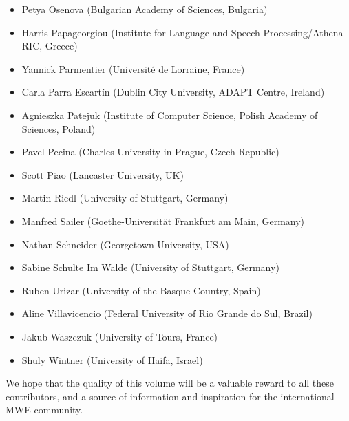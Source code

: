 \documentclass[output=paper,
modfonts,
]{langscibook}
\begin{document}
\begin{itemize}
\item Petya Osenova (Bulgarian Academy of Sciences, Bulgaria)
\item Harris Papageorgiou (Institute for Language and Speech Processing/Athena RIC, Greece)
\item Yannick Parmentier (Université de Lorraine, France)
\item Carla Parra Escartín (Dublin City University, ADAPT Centre, Ireland)
\item Agnieszka Patejuk (Institute of Computer Science, Polish Academy of Sciences, Poland)
\item Pavel Pecina (Charles University in Prague, Czech Republic)
\item Scott Piao (Lancaster University, UK)
\item Martin Riedl (University of Stuttgart, Germany)
\item Manfred Sailer (Goethe-Universität Frankfurt am Main, Germany)
\item Nathan Schneider (Georgetown University, USA)
\item Sabine Schulte Im Walde (University of Stuttgart, Germany)
\item Ruben Urizar (University of the Basque Country, Spain)
\item Aline Villavicencio (Federal University of Rio Grande do Sul, Brazil)
\item Jakub Waszczuk (University of Tours, France)
\item Shuly Wintner (University of Haifa, Israel)
\end{itemize}

We hope that the quality of this volume will be a valuable reward to all these contributors, and a source of information and inspiration for the international MWE community.
\end{document}
